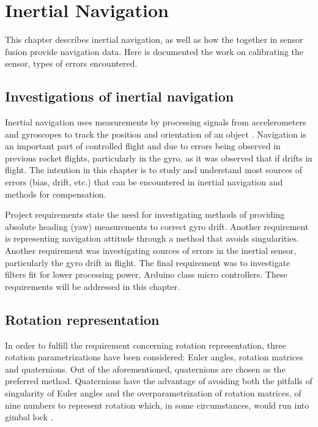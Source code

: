 \chapter{Inertial Navigation}

This chapter describes inertial navigation, as well as how the  together in sensor fusion provide navigation data. Here is documented the work on calibrating the sensor, types of errors encountered.

\section{Investigations of inertial navigation}
 
Inertial navigation uses measurements by processing signals from accelerometers and gyroscopes to track the position and orientation of an object \cite{UCAM-CL-TR-696}. Navigation is an important part of controlled flight and due to errors being observed in previous rocket flights, particularly in the gyro, as it was observed that if drifts in flight. The intention in this chapter is to study and understand most sources of errors (bias, drift, etc.) that can be encountered in inertial navigation and methods for compensation. 
 
Project requirements state the need for investigating methods of providing  absolute heading (yaw) measurements to correct gyro drift. 
Another requirement is representing navigation attitude through a method that avoids singularities. 
Another requirement was investigating sources of errors in the inertial sensor, particularly the gyro drift in flight.
The final requirement was to investigate filters fit for lower processing power, Arduino class micro controllers. These requirements will be addressed in this chapter. 

\section{Rotation representation}
 
In order to fulfill the requirement concerning rotation representation, three rotation parametrizations have been considered: Euler angles, rotation matrices and quaternions. Out of the aforementioned, quaternions are chosen as the preferred method. Quaternions have the advantage of avoiding both the pitfalls of singularity of Euler angles \cite{4104344} and the overparametrization of rotation matrices, of nine numbers to represent rotation which, in some circumstances, would run into gimbal lock \cite{desrochers2012intelligent}.

